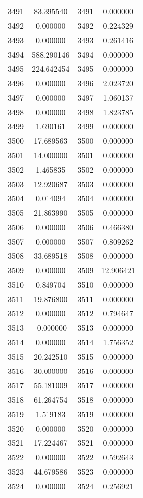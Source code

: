 \documentclass[12pt]{article}
\begin{document}
\begin{longtable}{@{}cccc@{}}
3491 & 83.395540 & 3491 & 0.000000 \\
3492 & 0.000000 & 3492 & 0.224329 \\
3493 & 0.000000 & 3493 & 0.261416 \\
3494 & 588.290146 & 3494 & 0.000000 \\
3495 & 224.642454 & 3495 & 0.000000 \\
3496 & 0.000000 & 3496 & 2.023720 \\
3497 & 0.000000 & 3497 & 1.060137 \\
3498 & 0.000000 & 3498 & 1.823785 \\
3499 & 1.690161 & 3499 & 0.000000 \\
3500 & 17.689563 & 3500 & 0.000000 \\
3501 & 14.000000 & 3501 & 0.000000 \\
3502 & 1.465835 & 3502 & 0.000000 \\
3503 & 12.920687 & 3503 & 0.000000 \\
3504 & 0.014094 & 3504 & 0.000000 \\
3505 & 21.863990 & 3505 & 0.000000 \\
3506 & 0.000000 & 3506 & 0.466380 \\
3507 & 0.000000 & 3507 & 0.809262 \\
3508 & 33.689518 & 3508 & 0.000000 \\
3509 & 0.000000 & 3509 & 12.906421 \\
3510 & 0.849704 & 3510 & 0.000000 \\
3511 & 19.876800 & 3511 & 0.000000 \\
3512 & 0.000000 & 3512 & 0.794647 \\
3513 & -0.000000 & 3513 & 0.000000 \\
3514 & 0.000000 & 3514 & 1.756352 \\
3515 & 20.242510 & 3515 & 0.000000 \\
3516 & 30.000000 & 3516 & 0.000000 \\
3517 & 55.181009 & 3517 & 0.000000 \\
3518 & 61.264754 & 3518 & 0.000000 \\
3519 & 1.519183 & 3519 & 0.000000 \\
3520 & 0.000000 & 3520 & 0.000000 \\
3521 & 17.224467 & 3521 & 0.000000 \\
3522 & 0.000000 & 3522 & 0.592643 \\
3523 & 44.679586 & 3523 & 0.000000 \\
3524 & 0.000000 & 3524 & 0.256921 \\

\end{longtable}
\end{document}
